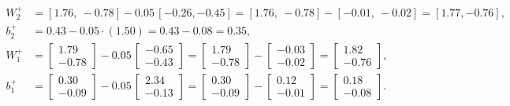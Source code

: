 \documentclass[11pt]{article}
\begin{document}
\begin{align*}
W_2^+&=[1.76,\ -0.78]-0.05\,[-0.26, -0.45]=[1.76,\ -0.78]-[-0.01,\ -0.02]=[1.77, -0.76],\\
b_2^+&=0.43-0.05\cdot(1.50)=0.43-0.08=0.35,\\
W_1^+&=\begin{bmatrix}1.79\\-0.78\end{bmatrix}-0.05\,\begin{bmatrix}-0.65\\-0.43\end{bmatrix}=\begin{bmatrix}1.79\\-0.78\end{bmatrix}-\begin{bmatrix}-0.03\\-0.02\end{bmatrix}=\begin{bmatrix}1.82\\-0.76\end{bmatrix},\\
b_1^+&=\begin{bmatrix}0.30\\-0.09\end{bmatrix}-0.05\,\begin{bmatrix}2.34\\-0.13\end{bmatrix}=\begin{bmatrix}0.30\\-0.09\end{bmatrix}-\begin{bmatrix}0.12\\-0.01\end{bmatrix}=\begin{bmatrix}0.18\\-0.08\end{bmatrix}.
\end{align*}
\end{document}
